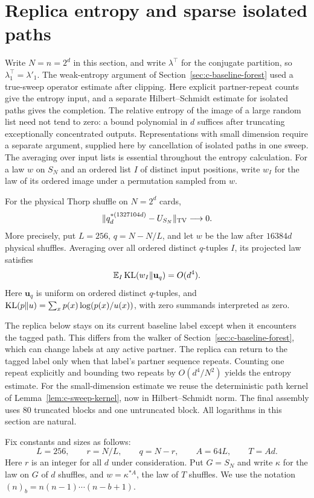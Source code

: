 \section{Replica entropy and sparse isolated paths}\label{c:sec:replica}
Write $N=n=2^d$ in this section, and write $\lambda^\top$ for the
conjugate partition, so $\lambda^\top_1=\lambda'_1$.
The weak-entropy argument of Section~\ref{sec:c-baseline-forest}
used a true-sweep operator estimate after clipping. Here explicit
partner-repeat counts give the entropy input, and a separate
Hilbert--Schmidt estimate for isolated paths gives the completion.
The relative entropy of the image of a large random list need not
tend to zero: a bound
polynomial in $d$ suffices after truncating exceptionally concentrated
outputs. Representations with small dimension require a separate
argument, supplied here by cancellation of isolated paths in one sweep.
The averaging over input lists is essential throughout the entropy
calculation. For a law $w$ on $S_N$ and an ordered list $I$ of distinct input positions, write
$w_I$ for the law of its ordered image under a permutation sampled from $w$.
\begin{theorem}\label{c:rep:main}
For the physical Thorp shuffle on $N=2^d$ cards,
\[
 \|q_d^{*(1327104d)}-U_{S_N}\|_{\mathrm{TV}}\longrightarrow0.
\]
More precisely, put $L=256$, $q=N-N/L$, and let $w$ be the law after $16384d$ physical
shuffles. Averaging over all ordered distinct $q$-tuples $I$, its projected law satisfies
\begin{equation}
 \mathbb E_I\operatorname{KL}(w_I\|\mathbf u_q)=O(d^4).\label{c:rep:e1}
\end{equation}
Here $\mathbf u_q$ is uniform on ordered distinct $q$-tuples, and
$\operatorname{KL}(p\|u)=\sum_xp(x)\log(p(x)/u(x))$, with zero summands interpreted as zero.
\end{theorem}
The replica below stays on its current baseline label except when it
encounters the tagged path. This differs from the walker of
Section~\ref{sec:c-baseline-forest}, which can change labels at any
active partner. The replica can return to the tagged label only when
that label's partner sequence repeats. Counting one repeat explicitly
and bounding two repeats by $O(d^4/N^2)$ yields the entropy estimate.
For the small-dimension estimate we reuse the deterministic path kernel
of Lemma~\ref{lem:c-sweep-kernel}, now in Hilbert--Schmidt norm. The
final assembly uses $80$ truncated blocks and one untruncated block.
All logarithms in this section are natural.

Fix constants and sizes as follows:
\[
L=256,\qquad r=N/L,\qquad q=N-r,\qquad A=64L,\qquad T=A d.
\]
Here \(r\) is an integer for all \(d\) under consideration. Put $G=S_N$ and write \(\kappa\)
for the law on
\(G\) of \(d\) shuffles, and \(w=\kappa^{*A}\), the law of \(T\) shuffles. We use the notation
\((n)_b=n(n-1)\cdots(n-b+1)\).

